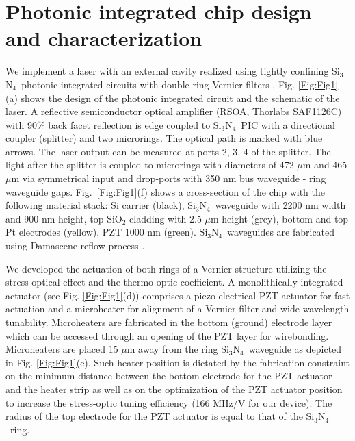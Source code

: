 \documentclass[9pt,twocolumn,twoside, superscriptaddress]{revtex4-2}
\newcommand{\SiN}[0]{Si$_3$N$_4$~}
\begin{document}
\section{Photonic integrated chip design and characterization}
We implement a laser with an external cavity realized using tightly confining \SiN photonic integrated circuits with double-ring Vernier filters \cite{tran2019tutorial}.
Fig. \ref{Fig:Fig1}(a) shows the design of the photonic integrated circuit and the schematic of the laser. 
A reflective semiconductor optical amplifier (RSOA, Thorlabs SAF1126C) with 90\% back facet reflection is edge coupled to \SiN PIC with a directional coupler (splitter) and two microrings.
The optical path is marked with blue arrows.
The laser output can be measured at ports 2, 3, 4 of the splitter.
The light after the splitter is coupled to microrings with diameters of 472 $\mu$m and 465 $\mu$m via symmetrical input and drop-ports with 350 nm bus waveguide - ring waveguide gaps. 
Fig.~\ref{Fig:Fig1}(f) shows a cross-section of the chip with the following material stack: Si carrier (black), \SiN waveguide with 2200 nm width and 900 nm height, top SiO$_2$ cladding with 2.5 $\mu$m height (grey), bottom and top Pt electrodes (yellow), PZT 1000 nm (green). 
\SiN waveguides are fabricated using Damascene reflow process \cite{Pfeiffer:18}. 

We developed the actuation of both rings of a Vernier structure utilizing the stress-optical effect and the thermo-optic coefficient.
A monolithically integrated actuator (see Fig. \ref{Fig:Fig1}(d)) comprises a piezo-electrical PZT actuator \cite{lihachev2022low,Wang:22} for fast actuation and a microheater for alignment of a Vernier filter and wide wavelength tunability.
Microheaters are fabricated in the bottom (ground) electrode layer which can be accessed through an opening of the PZT layer for wirebonding.
Microheaters are placed 15 $\mu$m away from the ring \SiN waveguide as depicted in Fig. \ref{Fig:Fig1}(e).
Such heater position is dictated by the fabrication constraint on the minimum distance between the bottom electrode for the PZT actuator and the heater strip as well as on the optimization of the PZT actuator position to increase the stress-optic tuning efficiency (166 MHz/V for our device).
The radius of the top electrode for the PZT actuator is equal to that of the \SiN ring.
\end{document}
